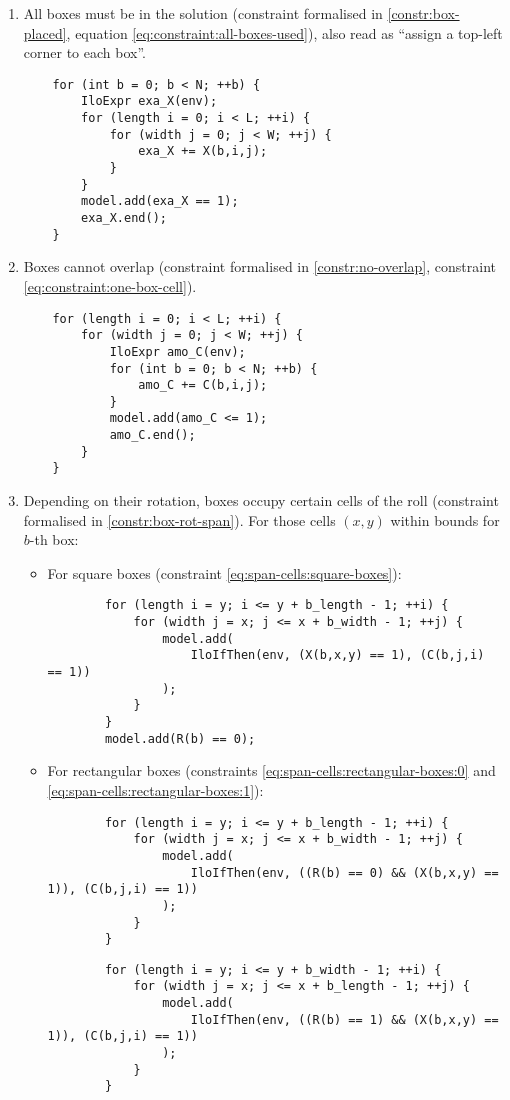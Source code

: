 \begin{enumerate}
	\item All boxes must be in the solution (constraint formalised in
	\ref{constr:box-placed}, equation \ref{eq:constraint:all-boxes-used}),
	also read as ``assign a top-left corner to each box''.
    
	{\NOINDENT \begin{lstlisting}
	for (int b = 0; b < N; ++b) {
		IloExpr exa_X(env);
		for (length i = 0; i < L; ++i) {
			for (width j = 0; j < W; ++j) {
				exa_X += X(b,i,j);
			}
		}
		model.add(exa_X == 1);
		exa_X.end();
	}
	\end{lstlisting}}
    
	\item Boxes cannot overlap (constraint formalised in
	\ref{constr:no-overlap}, constraint \ref{eq:constraint:one-box-cell}).
    
	{\NOINDENT \begin{lstlisting}
	for (length i = 0; i < L; ++i) {
		for (width j = 0; j < W; ++j) {
			IloExpr amo_C(env);
			for (int b = 0; b < N; ++b) {
				amo_C += C(b,i,j);
			}
			model.add(amo_C <= 1);
			amo_C.end();
		}
	}
	\end{lstlisting}}
    
	\item Depending on their rotation, boxes occupy certain cells of the roll
	(constraint formalised in \ref{constr:box-rot-span}). For those cells $(x,y)$ within
	bounds for $b$-th box:

	\begin{itemize}
		\item For square boxes (constraint \ref{eq:span-cells:square-boxes}):
		{\NOINDENT \begin{lstlisting}
		for (length i = y; i <= y + b_length - 1; ++i) {
			for (width j = x; j <= x + b_width - 1; ++j) {
				model.add(
					IloIfThen(env, (X(b,x,y) == 1), (C(b,j,i) == 1))
				);
			}
		}
		model.add(R(b) == 0);
		\end{lstlisting}}
		
		\item For rectangular boxes (constraints \ref{eq:span-cells:rectangular-boxes:0} and
		\ref{eq:span-cells:rectangular-boxes:1}):
		{\NOINDENT \begin{lstlisting}
		for (length i = y; i <= y + b_length - 1; ++i) {
			for (width j = x; j <= x + b_width - 1; ++j) {
				model.add(
					IloIfThen(env, ((R(b) == 0) && (X(b,x,y) == 1)), (C(b,j,i) == 1))
				);
			}
		}
		\end{lstlisting}}
		{\NOINDENT \begin{lstlisting}
		for (length i = y; i <= y + b_width - 1; ++i) {
			for (width j = x; j <= x + b_length - 1; ++j) {
				model.add(
					IloIfThen(env, ((R(b) == 1) && (X(b,x,y) == 1)), (C(b,j,i) == 1))
				);
			}
		}
		\end{lstlisting}}
	\end{itemize}
    

\end{enumerate}
